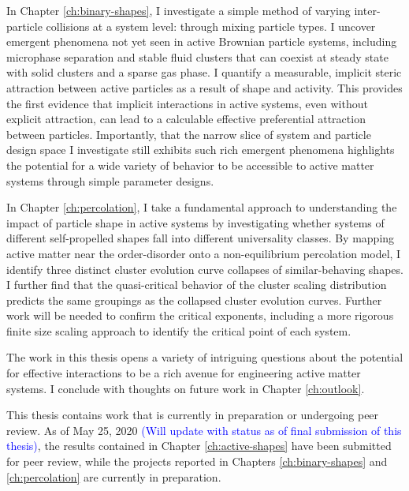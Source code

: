In Chapter \ref{ch:binary-shapes}, I investigate a simple method of varying inter-particle collisions at a system level: through mixing particle types. I uncover emergent phenomena not yet seen in active Brownian particle systems, including microphase separation and stable fluid clusters that can coexist at steady state with solid clusters and a sparse gas phase. I quantify a measurable, implicit steric attraction between active particles as a result of shape and activity. This provides the first evidence that implicit interactions in active systems, even without explicit attraction, can lead to a calculable effective preferential attraction between particles. Importantly, that the narrow slice of system and particle design space I investigate still exhibits such rich emergent phenomena highlights the potential for a wide variety of behavior to be accessible to active matter systems through simple parameter designs.

In Chapter \ref{ch:percolation}, I take a fundamental approach to understanding the impact of particle shape in active systems by investigating whether systems of different self-propelled shapes fall into different universality classes. By mapping active matter near the order-disorder onto a non-equilibrium percolation model, I identify three distinct cluster evolution curve collapses of similar-behaving shapes. I further find that the quasi-critical behavior of the cluster scaling distribution predicts the same groupings as the collapsed cluster evolution curves. Further work will be needed to confirm the critical exponents, including a more rigorous finite size scaling approach to identify the critical point of each system.

The work in this thesis opens a variety of intriguing questions about the potential for effective interactions to be a rich avenue for engineering active matter systems. I conclude with thoughts on future work in Chapter \ref{ch:outlook}.

This thesis contains work that is currently in preparation or undergoing peer review. As of May 25, 2020 \textcolor{blue}{(Will update with status as of final submission of this thesis)}, the results contained in Chapter \ref{ch:active-shapes} have been submitted for peer review, while the projects reported in Chapters \ref{ch:binary-shapes} and \ref{ch:percolation} are currently in preparation.
